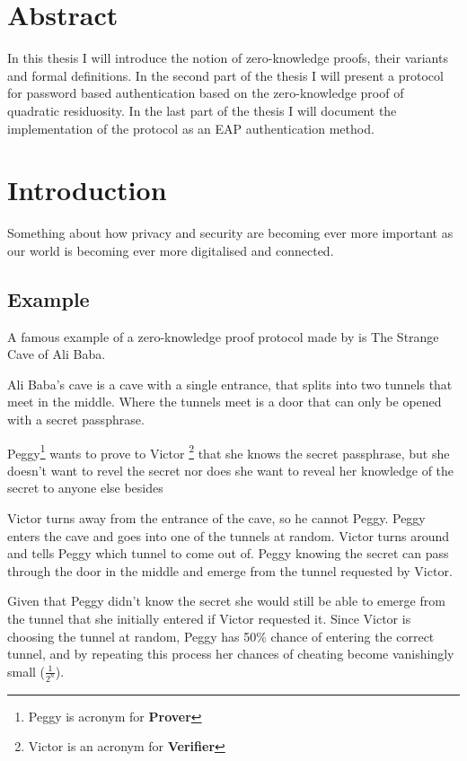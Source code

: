 \section{Abstract}
In this thesis I will introduce the notion of zero-knowledge proofs, their variants and formal definitions.
In the second part of the thesis I will present a protocol for password based authentication based on the zero-knowledge proof of quadratic residuosity.
In the last part of the thesis I will document the implementation of the protocol as an EAP authentication method. %

\section{Introduction}
Something about how privacy and security are becoming ever more important as our world is becoming ever more digitalised and connected. %

\subsection{Example}
A famous example of a zero-knowledge proof protocol made by \cite{QJM} is The Strange Cave of Ali Baba.

\bigskip

Ali Baba's cave is a cave with a single entrance, that splits into two tunnels that meet in the middle. Where the tunnels meet is a door that can only be opened with a secret passphrase.

\bigskip

Peggy\footnote{Peggy is acronym for \textbf{Prover}} wants to prove to Victor \footnote{Victor is an acronym for \textbf{Verifier}} that she knows the secret passphrase, but she doesn't want to revel the secret nor does she want to reveal her knowledge of the secret to anyone else besides 

\bigskip

Victor turns away from the entrance of the cave, so he cannot Peggy. Peggy enters the cave and goes into one of the tunnels at random. Victor turns around and tells Peggy which tunnel to come out of. Peggy knowing the secret can pass through the door in the middle and emerge from the tunnel requested by Victor.

\bigskip

Given that Peggy didn't know the secret she would still be able to emerge from the tunnel that she initially entered if Victor requested it. Since Victor is choosing the tunnel at random, Peggy has 50\% chance of entering the correct tunnel, and by repeating this process her chances of cheating become vanishingly small ($\frac{1}{2^n}$).

